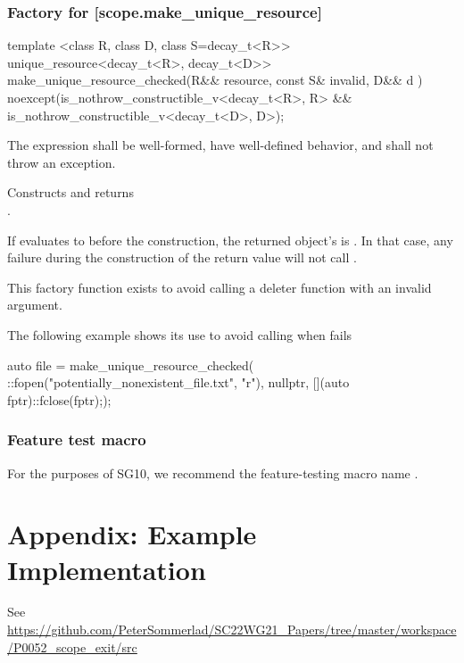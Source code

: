 \documentclass[ebook,11pt,article]{memoir}
\begin{document}
\subsection {Factory for  [scope.make_unique_resource]}

\begin{itemdecl}
template <class R, class D, class S=decay_t<R>>
unique_resource<decay_t<R>, decay_t<D>>
make_unique_resource_checked(R&& resource, const S& invalid, D&& d ) 
noexcept(is_nothrow_constructible_v<decay_t<R>, R> &&
         is_nothrow_constructible_v<decay_t<D>, D>);
\end{itemdecl}

\begin{itemdescr}
\pnum
\requires The expression  shall be well-formed, have well-defined behavior, and shall not throw an exception.

\pnum
\effects Constructs and returns \\
. 

\pnum
If  evaluates to  before the construction, the returned  object's  is . 
In that case, any failure during the construction of the return value will not call .

\pnum
\begin{note}
This factory function exists to avoid calling a deleter function with an invalid argument. 
\end{note}

\pnum
\begin{example}
The following example shows its use to avoid calling  when  fails
\begin{codeblock}
auto file = make_unique_resource_checked(
  ::fopen("potentially_nonexistent_file.txt", "r"), 
  nullptr, [](auto fptr){::fclose(fptr);});
\end{codeblock}
\end{example}

\end{itemdescr}


\subsection {Feature test macro}
For the purposes of SG10, we recommend the feature-testing macro name .

\chapter{Appendix: Example Implementation} 
See 
\url{https://github.com/PeterSommerlad/SC22WG21_Papers/tree/master/workspace/P0052_scope_exit/src}
\end{document}
